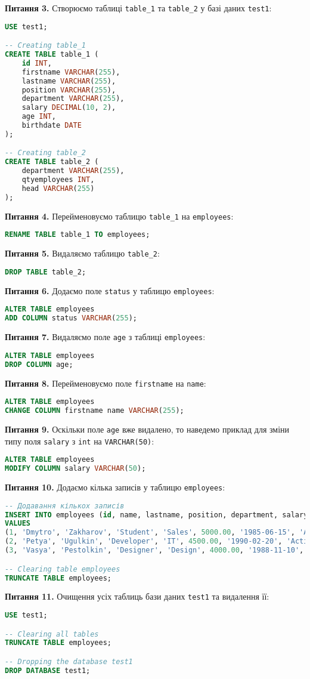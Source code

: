 \documentclass{hw_template}
\begin{document}
\textbf{Питання 3.} Створюємо таблиці \texttt{table\_1} та \texttt{table\_2} у 
базі даних \texttt{test1}:
\begin{lstlisting}[language=SQL]
USE test1;

-- Creating table_1
CREATE TABLE table_1 (
    id INT,
    firstname VARCHAR(255),
    lastname VARCHAR(255),
    position VARCHAR(255),
    department VARCHAR(255),
    salary DECIMAL(10, 2),
    age INT,
    birthdate DATE
);

-- Creating table_2
CREATE TABLE table_2 (
    department VARCHAR(255),
    qtyemployees INT,
    head VARCHAR(255)
);
\end{lstlisting}

\textbf{Питання 4.} Перейменовуємо таблицю \texttt{table\_1} на \texttt{employees}:
\begin{lstlisting}[language=SQL]
RENAME TABLE table_1 TO employees;
\end{lstlisting}

\textbf{Питання 5.} Видаляємо таблицю \texttt{table\_2}:
\begin{lstlisting}[language=SQL]
DROP TABLE table_2;
\end{lstlisting}

\textbf{Питання 6.} Додаємо поле \texttt{status} у таблицю \texttt{employees}:
\begin{lstlisting}[language=SQL]
ALTER TABLE employees
ADD COLUMN status VARCHAR(255);
\end{lstlisting}

\textbf{Питання 7.} Видаляємо поле \texttt{age} з таблиці \texttt{employees}:
\begin{lstlisting}[language=SQL]
ALTER TABLE employees
DROP COLUMN age;
\end{lstlisting}

\textbf{Питання 8.} Перейменовуємо поле \texttt{firstname} на \texttt{name}:
\begin{lstlisting}[language=SQL]
ALTER TABLE employees
CHANGE COLUMN firstname name VARCHAR(255);
\end{lstlisting}

\textbf{Питання 9.} Оскільки поле \texttt{age} вже видалено, то наведемо приклад 
для зміни типу поля \texttt{salary} з \texttt{int} на \texttt{VARCHAR(50)}:
\begin{lstlisting}[language=SQL]
ALTER TABLE employees
MODIFY COLUMN salary VARCHAR(50);
\end{lstlisting}

\textbf{Питання 10.} Додаємо кілька записів у таблицю \texttt{employees}:
\begin{lstlisting}[language=SQL]
-- Додавання кількох записів
INSERT INTO employees (id, name, lastname, position, department, salary, birthdate, status)
VALUES 
(1, 'Dmytro', 'Zakharov', 'Student', 'Sales', 5000.00, '1985-06-15', 'Active'),
(2, 'Petya', 'Ugulkin', 'Developer', 'IT', 4500.00, '1990-02-20', 'Active'),
(3, 'Vasya', 'Pestolkin', 'Designer', 'Design', 4000.00, '1988-11-10', 'Inactive');

-- Clearing table employees
TRUNCATE TABLE employees;
\end{lstlisting}

\textbf{Питання 11.} Очищення усіх таблиць бази даних \texttt{test1} та видалення її:
\begin{lstlisting}[language=SQL]
USE test1;

-- Clearing all tables
TRUNCATE TABLE employees;

-- Dropping the database test1
DROP DATABASE test1;
\end{lstlisting}
\end{document}
